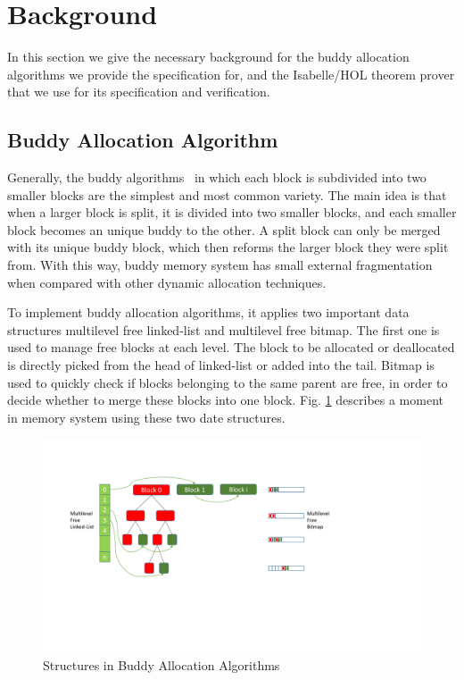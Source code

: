 \section{Background}
In this section we give the necessary background for the buddy allocation algorithms we provide the specification for, and the Isabelle/HOL theorem prover that we use for its specification and verification.

\subsection{Buddy Allocation Algorithm}
Generally, the buddy algorithms~\cite{reg_knowlton} in which each block is subdivided into two smaller blocks are the simplest and most common variety. The main idea is that when a larger block is split, it is divided into two smaller blocks, and each smaller block becomes an unique buddy to the other. A split block can only be merged with its unique buddy block, which then reforms the larger block they were split from. With this way, buddy memory system has small external fragmentation when compared with other dynamic allocation techniques.

To implement buddy allocation algorithms, it applies two important data structures multilevel free linked-list and multilevel free bitmap. The first one is used to manage free blocks at each level. The block to be allocated or deallocated is directly picked from the head of linked-list or added into the tail. Bitmap is used to quickly check if blocks belonging to the same parent are free, in order to decide whether to merge these blocks into one block. Fig. \ref{fig3} describes a moment in memory system using these two date structures.

\begin{figure}
	\centering
	\includegraphics[width=1\textwidth]{fig3.pdf}
	\caption{Structures in Buddy Allocation Algorithms}
	\label{fig3}
\end{figure}

